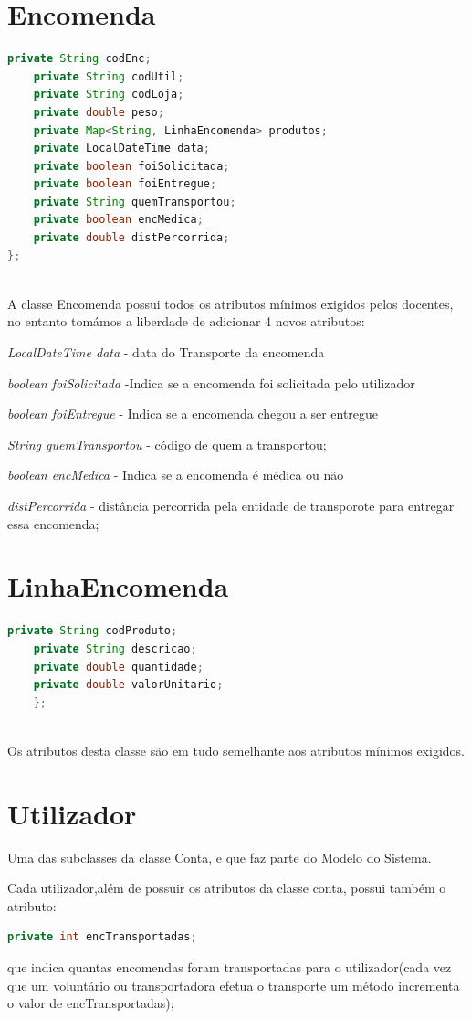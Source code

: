 \documentclass[a4paper]{report}
\begin{document}
	
	
	\section{Encomenda}
	\begin{lstlisting}[language=Java]
	private String codEnc;
	private String codUtil;
	private String codLoja;
	private double peso;
	private Map<String, LinhaEncomenda> produtos;
	private LocalDateTime data;
	private boolean foiSolicitada;
	private boolean foiEntregue;
	private String quemTransportou;
	private boolean encMedica;
	private double distPercorrida;
};
   
	\end{lstlisting}
	A classe Encomenda possui todos os atributos mínimos exigidos pelos docentes, no entanto tomámos a liberdade de adicionar 4 novos atributos:
	
	  	\textit{LocalDateTime data} - data do Transporte da encomenda
	  	
	  \textit{boolean foiSolicitada} -Indica se a encomenda foi solicitada pelo utilizador
	  
	  \textit{boolean foiEntregue}  - Indica se a encomenda chegou a ser entregue 
	  
	  \textit{String quemTransportou} - código de quem a transportou;
	  
	  \textit{boolean encMedica} - Indica se a encomenda é médica ou não
	  
	  \textit{distPercorrida} - distância percorrida pela entidade de transporote para entregar  	essa encomenda;
	  
	
		\section{LinhaEncomenda}
	\begin{lstlisting}[language=Java]
	private String codProduto;
	private String descricao;
	private double quantidade;
	private double valorUnitario;
	};
	
	\end{lstlisting}
		Os atributos desta classe são em tudo semelhante aos atributos mínimos exigidos.
		
	\section{Utilizador}
	Uma das subclasses da classe Conta, e que faz parte do Modelo do Sistema.	
	
	Cada utilizador,além de possuir os atributos da classe conta, possui também o atributo:
	\begin{lstlisting}[language=Java]
	private int encTransportadas;
	\end{lstlisting}
	que indica quantas encomendas foram transportadas para o utilizador(cada vez que um voluntário ou transportadora efetua o transporte um método incrementa o valor de encTransportadas);
	
\end{document}
